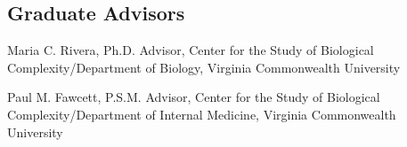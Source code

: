 \subsection*{Graduate Advisors}

\begin{packed_item}
	\item{Maria C. Rivera, Ph.D. Advisor, Center for the Study of Biological Complexity/Department of Biology, 
	Virginia Commonwealth University }	
	\item{Paul M. Fawcett, P.S.M. Advisor,  Center for the Study of Biological Complexity/Department of Internal 
	Medicine, Virginia Commonwealth University}	
\end{packed_item}


\renewcommand{\thesection}{\Arabic{section}}
\renewcommand{\thesubsection}{\thesection.\Arabic{subsection}}




